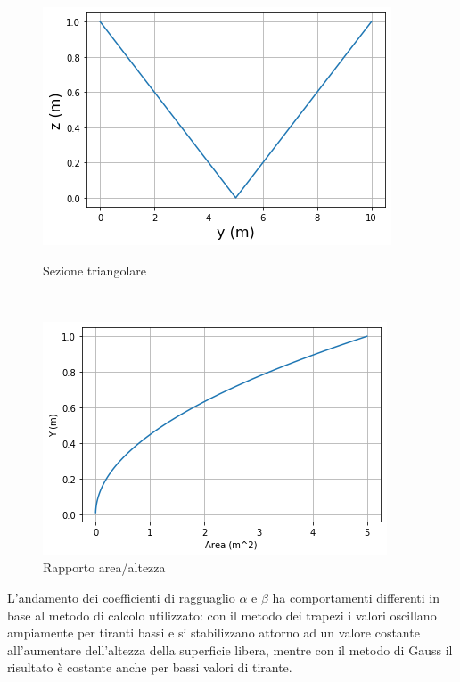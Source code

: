 \documentclass[12pt]{article} %
\begin{document}
\begin{figure}[H]
\begin{minipage}[b]{8.5cm}
\centering
    \includegraphics[width=1 \textwidth]{sezionetri.png}
    \caption{Sezione triangolare}
    \label{fig:triangolare_sezione}
\end{minipage}
\ \hspace{2mm} \hspace{3mm} \
\begin{minipage}[b]{8.5cm}
    \centering
    \includegraphics[width=1 \textwidth]{rapporto area altezzatri.png}
    \caption{Rapporto area/altezza}
    \label{fig:triangolare_area/altezza}
\end{minipage}
\end{figure}

\noindent L’andamento dei coefficienti di ragguaglio $\alpha$ e $\beta$ ha comportamenti differenti in base al metodo di calcolo utilizzato: con il metodo dei trapezi i valori oscillano ampiamente per tiranti bassi e si stabilizzano attorno ad un valore costante all’aumentare dell’altezza della superficie libera, mentre con il metodo di Gauss il risultato è costante anche per bassi valori di tirante. 
\end{document}
